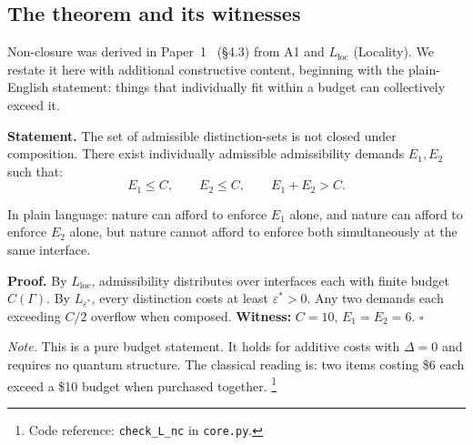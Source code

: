 \documentclass[11pt]{article}
\newcommand{\coderef}[2]{\footnote{Code reference: \texttt{#1} in \texttt{#2}.}}
\begin{document}
\subsection{The theorem and its witnesses}

Non-closure was derived in Paper~1~\cite{BrookePaper1} (\S4.3) from A1 and $L_{\mathrm{loc}}$ (Locality).  We restate it here with additional constructive content, beginning with the plain-English statement: things that individually fit within a budget can collectively exceed it.

\begin{tcolorbox}[apfbox, title={Lemma $L_{\mathrm{nc}}^{\mathrm{budget}}$ (Budget Non-Closure)}]
\textbf{Statement.}  The set of admissible distinction-sets is not closed under composition.  There exist individually admissible admissibility demands $E_1, E_2$ such that:
\begin{equation}
E_1 \le C, \qquad E_2 \le C, \qquad E_1 + E_2 > C.
\label{eq:nonclosure}
\end{equation}

In plain language: nature can afford to enforce $E_1$ alone, and nature can afford to enforce $E_2$ alone, but nature cannot afford to enforce both simultaneously at the same interface.

\smallskip\noindent\textbf{Proof.}  By $L_{\mathrm{loc}}$, admissibility distributes over interfaces each with finite budget $C(\Gamma)$.  By $L_{\varepsilon^*}$, every distinction costs at least $\varepsilon^* > 0$.  Any two demands each exceeding $C/2$ overflow when composed.  \textbf{Witness:} $C = 10$, $E_1 = E_2 = 6$.  $\square$

\smallskip\noindent\textit{Note.}  This is a pure budget statement.  It holds for additive costs with $\Delta = 0$ and requires no quantum structure.  The classical reading is: two items costing \$6 each exceed a \$10 budget when purchased together.
\coderef{check\_L\_nc}{core.py}
\end{tcolorbox}
\end{document}
